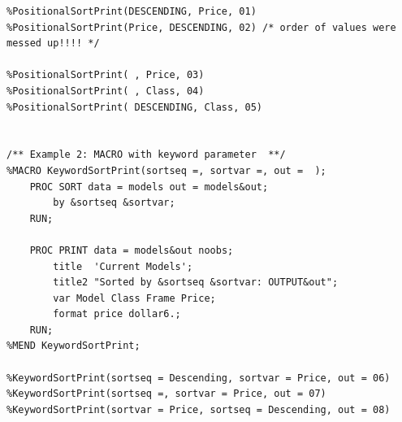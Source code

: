 \documentclass[
]{book}
\begin{document}
\begin{verbatim}
%PositionalSortPrint(DESCENDING, Price, 01)
%PositionalSortPrint(Price, DESCENDING, 02) /* order of values were messed up!!!! */

%PositionalSortPrint( , Price, 03)
%PositionalSortPrint( , Class, 04)
%PositionalSortPrint( DESCENDING, Class, 05)


/** Example 2: MACRO with keyword parameter  **/
%MACRO KeywordSortPrint(sortseq =, sortvar =, out =  );
    PROC SORT data = models out = models&out;
        by &sortseq &sortvar;
    RUN;

    PROC PRINT data = models&out noobs;
        title  'Current Models';
        title2 "Sorted by &sortseq &sortvar: OUTPUT&out";
        var Model Class Frame Price;
        format price dollar6.;
    RUN;
%MEND KeywordSortPrint;

%KeywordSortPrint(sortseq = Descending, sortvar = Price, out = 06)
%KeywordSortPrint(sortseq =, sortvar = Price, out = 07)
%KeywordSortPrint(sortvar = Price, sortseq = Descending, out = 08)
\end{verbatim}

  
\end{document}

